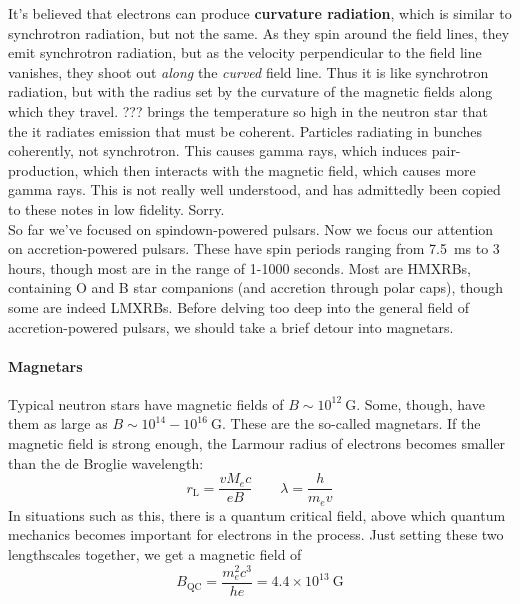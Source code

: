 \documentclass[10pt]{article}
\numberwithin{equation}{section}
\newcommand{\n}{\noindent}
\begin{document}
	\n It's believed that electrons can produce \textbf{curvature radiation}, which is similar to synchrotron radiation, but not the same.  As they spin around the field lines, they emit synchrotron radiation, but as the velocity perpendicular to the field line vanishes, they shoot out \emph{along} the \emph{curved} field line. Thus it is like synchrotron radiation, but with the radius set by the curvature of the magnetic fields along which they travel. ??? brings the temperature so high in the neutron star that the it radiates emission that must be coherent. Particles radiating in bunches coherently, not synchrotron. This causes gamma rays, which induces pair-production, which then interacts with the magnetic field, which causes more gamma rays. This is not really well understood, and has admittedly been copied to these notes in low fidelity. Sorry.\\
	
	\n So far we've focused on spindown-powered pulsars. Now we focus our attention on accretion-powered pulsars. These have spin periods ranging from 7.5\ ms to 3 hours, though most are in the range of 1-1000 seconds. Most are HMXRBs, containing O and B star companions (and accretion through polar caps), though some are indeed LMXRBs. Before delving too deep into the general field of accretion-powered pulsars, we should take a brief detour into magnetars.
	
	\paragraph{Magnetars} %
	\label{par:magnetars}
	Typical neutron stars have magnetic fields of $B\sim 10^{12}\ \mathrm{G}$. Some, though, have them as large as $B\sim 10^{14}-10^{16}\ \mathrm{G}$. These are the so-called magnetars. If the magnetic field is strong enough, the Larmour radius of electrons becomes smaller than the de Broglie wavelength:
	\begin{equation}
		\label{eq:magnetar:1} r_{\mathrm{L}} = \frac{vM_e c}{eB} \qquad \lambda = \frac{h}{m_ev}
	\end{equation}
	In situations such as this, there is a quantum critical field, above which quantum mechanics becomes important for electrons in the process. Just setting these two lengthscales together, we get a magnetic field of
	\begin{equation}
		\label{eq:magnetar:2} B_{\mathrm{QC}} = \frac{m_e^2 c^3}{he} = 4.4\times 10^{13}\ \mathrm{G}
	\end{equation}
\end{document}
